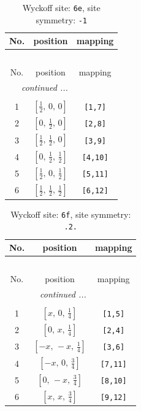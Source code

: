 \documentclass[fleqn,8pt]{jsarticle}
\begin{document}
\renewcommand{\arraystretch}{1.2}
\begin{longtable}{ccc}
\caption{Wyckoff site: {\tt 6e}, site symmetry: {\tt -1}}
 \\
 \hline \hline
No. & position & mapping \\ \hline \endfirsthead

\multicolumn{2}{l}{\tablename\ \thetable{}} \\
 \hline \hline
No. & position & mapping \\ \hline \endhead

 \hline \hline
\multicolumn{2}{r}{\footnotesize\it continued ...} \\ \endfoot

 \hline \hline
\multicolumn{2}{r}{} \\ \endlastfoot

1 & $\left[ \frac{1}{2},\, 0,\, 0 \right]$ & {\tt [1,7]} \\ \hline
2 & $\left[ 0,\, \frac{1}{2},\, 0 \right]$ & {\tt [2,8]} \\ \hline
3 & $\left[ \frac{1}{2},\, \frac{1}{2},\, 0 \right]$ & {\tt [3,9]} \\ \hline
4 & $\left[ 0,\, \frac{1}{2},\, \frac{1}{2} \right]$ & {\tt [4,10]} \\ \hline
5 & $\left[ \frac{1}{2},\, 0,\, \frac{1}{2} \right]$ & {\tt [5,11]} \\ \hline
6 & $\left[ \frac{1}{2},\, \frac{1}{2},\, \frac{1}{2} \right]$ & {\tt [6,12]} \\
\end{longtable}
\renewcommand{\arraystretch}{1.2}
\begin{longtable}{ccc}
\caption{Wyckoff site: {\tt 6f}, site symmetry: {\tt .2.}}
 \\
 \hline \hline
No. & position & mapping \\ \hline \endfirsthead

\multicolumn{2}{l}{\tablename\ \thetable{}} \\
 \hline \hline
No. & position & mapping \\ \hline \endhead

 \hline \hline
\multicolumn{2}{r}{\footnotesize\it continued ...} \\ \endfoot

 \hline \hline
\multicolumn{2}{r}{} \\ \endlastfoot

1 & $\left[ x,\, 0,\, \frac{1}{4} \right]$ & {\tt [1,5]} \\ \hline
2 & $\left[ 0,\, x,\, \frac{1}{4} \right]$ & {\tt [2,4]} \\ \hline
3 & $\left[ - x,\, - x,\, \frac{1}{4} \right]$ & {\tt [3,6]} \\ \hline
4 & $\left[ - x,\, 0,\, \frac{3}{4} \right]$ & {\tt [7,11]} \\ \hline
5 & $\left[ 0,\, - x,\, \frac{3}{4} \right]$ & {\tt [8,10]} \\ \hline
6 & $\left[ x,\, x,\, \frac{3}{4} \right]$ & {\tt [9,12]} \\
\end{longtable}
\end{document}
